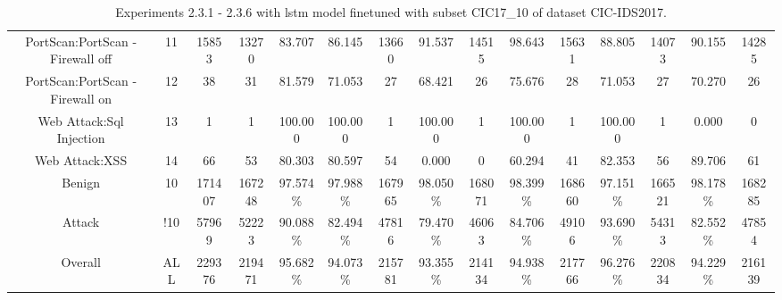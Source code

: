 \begin{table}[htb]
\begin{tabular}{@{}ccccccccccccccc@{}}
        PortScan:PortScan - Firewall off &  11 &  15853 &  13270 &  83.707 &  86.145 &  13660 &  91.537 &  14515 &  98.643 &  15631 &  88.805 &  14073 &  90.155 &  14285 \\
        PortScan:PortScan - Firewall on &  12 &  38 &  31 &  81.579 &  71.053 &  27 &  68.421 &  26 &  75.676 &  28 &  71.053 &  27 &  70.270 &  26 \\
        Web Attack:Sql Injection &  13 &  1 &  1 &  100.000 &  100.000 &  1 &  100.000 &  1 &  100.000 &  1 &  100.000 &  1 &  0.000 &  0 \\
        Web Attack:XSS &  14 &  66 &  53 &  80.303 &  80.597 &  54 &  0.000 &  0 &  60.294 &  41 &  82.353 &  56 &  89.706 &  61 \\
        Benign &  10 &  171407 &  167248 &  97.574\% &  97.988\% &  167965 &  98.050\% &  168071 &  98.399\% &  168660 &  97.151\% &  166521 &  98.178\% &  168285 \\
        Attack &  !10 &  57969 &  52223 &  90.088\% &  82.494\% &  47816 &  79.470\% &  46063 &  84.706\% &  49106 &  93.690\% &  54313 &  82.552\% &  47854 \\
        Overall &  ALL &  229376 &  219471 &  95.682\% &  94.073\% &  215781 &  93.355\% &  214134 &  94.938\% &  217766 &  96.276\% &  220834 &  94.229\% &  216139 \\
        \bottomrule
    \end{tabular}
    \caption{Experiments 2.3.1 - 2.3.6 with \gls{lstm} model finetuned with subset CIC17\_10 of dataset CIC-IDS2017.}
    \label{table:results:lstm:flows_subset}
\end{table}